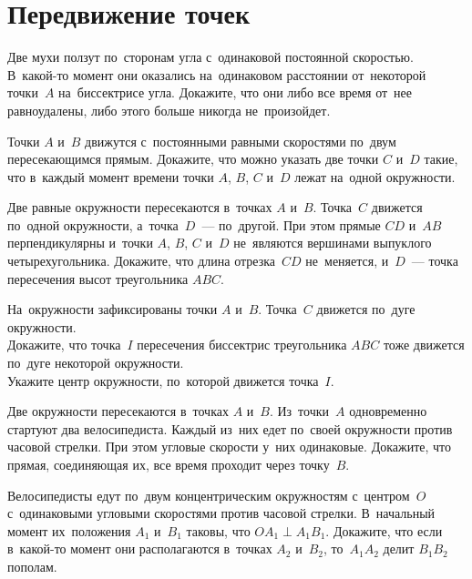 
\section*{Передвижение точек}


\begin{problems}

\item
Две мухи ползут по~сторонам угла с~одинаковой постоянной скоростью.
В~какой-то момент они оказались на~одинаковом расстоянии от~некоторой точки~$A$
на~биссектрисе угла.
Докажите, что они либо все время от~нее равноудалены, либо этого больше никогда
не~произойдет.

\item
Точки $A$ и~$B$ движутся с~постоянными равными скоростями по~двум
пересекающимся прямым.
Докажите, что можно указать две точки $C$ и~$D$ такие, что в~каждый момент
времени точки $A$, $B$, $C$ и~$D$ лежат на~одной окружности.

\item
Две равные окружности пересекаются в~точках $A$ и~$B$.
Точка~$C$ движется по~одной окружности, а~точка~$D$~--- по~другой.
При этом прямые $CD$ и~$AB$ перпендикулярны и~точки $A$, $B$, $C$ и~$D$
не~являются вершинами выпуклого четырехугольника.
Докажите, что длина отрезка~$CD$ не~меняется, и~$D$~--- точка пересечения высот
треугольника $ABC$.

\item
На~окружности зафиксированы точки $A$ и~$B$.
Точка~$C$ движется по~дуге окружности.
\\
\sp
Докажите, что точка~$I$ пересечения биссектрис треугольника $ABC$ тоже движется
по~дуге некоторой окружности.
\\
\sp
Укажите центр окружности, по~которой движется точка~$I$.

\item
Две окружности пересекаются в~точках $A$ и~$B$.
Из~точки~$A$ одновременно стартуют два велосипедиста.
Каждый из~них едет по~своей окружности против часовой стрелки.
При этом угловые скорости у~них одинаковые.
Докажите, что прямая, соединяющая их, все время проходит через точку~$B$.

\item
Велосипедисты едут по~двум концентрическим окружностям с~центром~$O$
с~одинаковыми угловыми скоростями против часовой стрелки.
В~начальный момент их~положения $A_1$  и~$B_1$ таковы, что
$O A_1 \perp A_1 B_1$.
Докажите, что если в~какой-то момент они располагаются в~точках $A_2$ и~$B_2$,
то~$A_1 A_2$ делит $B_1 B_2$ пополам.


\end{problems}

